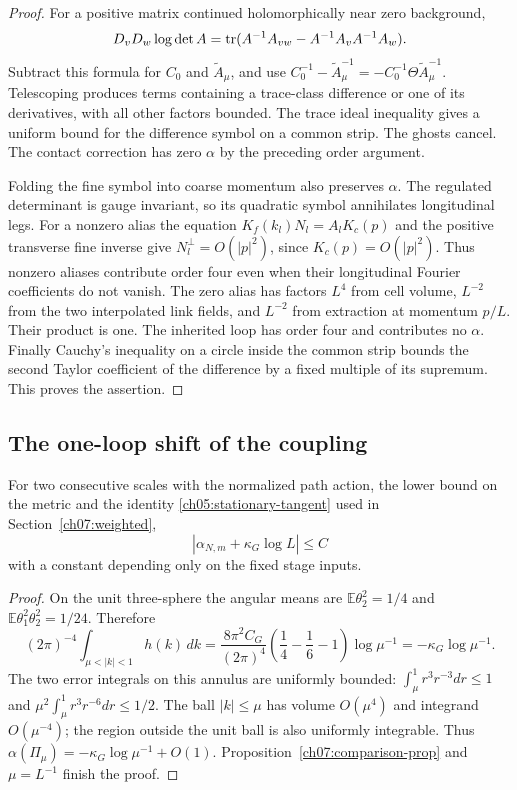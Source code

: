 \begin{proof}
For a positive matrix continued holomorphically near zero background,
\[
 D_vD_w\log\det A
 =\operatorname{tr}(A^{-1}A_{vw}-A^{-1}A_vA^{-1}A_w).
\]
Subtract this formula for $C_0$ and $\widetilde A_\mu$, and use
$C_0^{-1}-\widetilde A_\mu^{-1}
=-C_0^{-1}\Theta\widetilde A_\mu^{-1}$.
Telescoping produces terms containing a trace-class difference or one
of its derivatives, with all other factors bounded. The trace ideal
inequality gives a uniform bound for the difference symbol on a common
strip. The ghosts cancel. The contact correction has zero $\alpha$ by
the preceding order argument.

Folding the fine symbol into coarse momentum also preserves $\alpha$.
The regulated determinant is gauge invariant, so its quadratic symbol
annihilates longitudinal legs. For a nonzero alias the equation
$K_f(k_l)N_l=A_lK_c(p)$ and the positive transverse fine inverse give
$N_l^\perp=O(|p|^2)$, since $K_c(p)=O(|p|^2)$. Thus nonzero
aliases contribute order four even when their longitudinal Fourier coefficients
do not vanish. The zero alias has factors $L^4$ from
cell volume, $L^{-2}$ from the two interpolated link fields, and
$L^{-2}$ from extraction at momentum $p/L$. Their product is one.
The inherited loop has order four and contributes no $\alpha$.
Finally Cauchy's inequality on a circle inside the common strip bounds
the second Taylor coefficient of the difference by a fixed multiple of
its supremum. This proves the assertion.
\end{proof}

\subsection{The one-loop shift of the coupling}

\begin{proposition}\label{ch07:slope}
For two consecutive scales with the normalized path action, the lower bound on the metric and the
identity \eqref{ch05:stationary-tangent} used in Section~\ref{ch07:weighted},
\[
 |\alpha_{N,m}+\kappa_G\log L|\le C
\]
with a constant depending only on the fixed stage inputs.
\end{proposition}

\begin{proof}
On the unit three-sphere the angular means are
$\mathbb E\theta_2^2=1/4$ and
$\mathbb E\theta_1^2\theta_2^2=1/24$. Therefore
\[
 (2\pi)^{-4}\int_{\mu<|k|<1}h(k)\,dk
 =\frac{8\pi^2C_G}{(2\pi)^4}
   \left(\frac14-\frac16-1\right)\log\mu^{-1}
 =-\kappa_G\log\mu^{-1}.
\]
The two error integrals on this annulus are uniformly bounded:
$\int_\mu^1 r^3r^{-3}dr\le1$ and
$\mu^2\int_\mu^1r^3r^{-6}dr\le1/2$.
The ball $|k|\le\mu$ has volume $O(\mu^4)$ and integrand
$O(\mu^{-4})$; the region outside the unit ball is also uniformly
integrable. Thus $\alpha(\Pi_\mu)=-\kappa_G\log\mu^{-1}+O(1)$.
Proposition~\ref{ch07:comparison-prop} and $\mu=L^{-1}$ finish the proof.
\end{proof}

